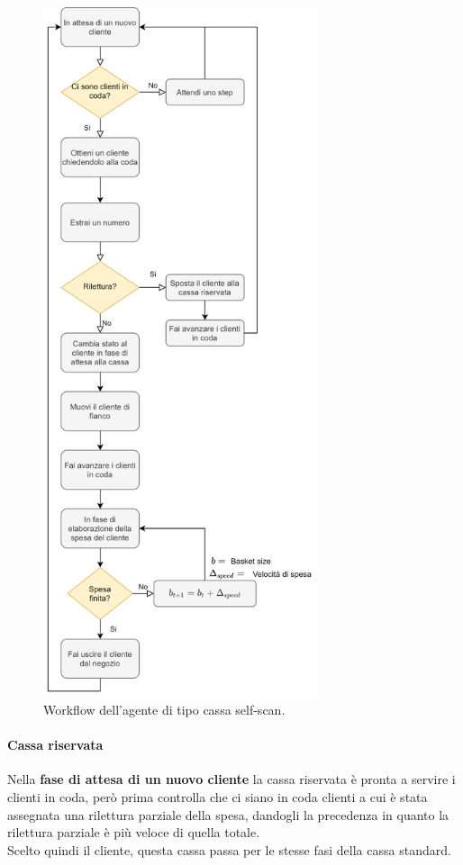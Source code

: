 \begin{figure}[H]
	\centering
	\includegraphics[width=8cm]{"images/workflow_cashdesk_self_scan.png"}
	\caption{Workflow dell'agente di tipo cassa self-scan.}
	\label{fig:workflow_cashdesk_self_scan}
\end{figure}

\paragraph{Cassa riservata}

Nella \textbf{fase di attesa di un nuovo cliente} la cassa riservata è pronta a servire i clienti in coda, però prima controlla che ci siano in coda clienti a cui è stata assegnata una rilettura parziale della spesa, dandogli la precedenza in quanto la rilettura parziale è più veloce di quella totale. \\
Scelto quindi il cliente, questa cassa passa per le stesse fasi della cassa standard.

